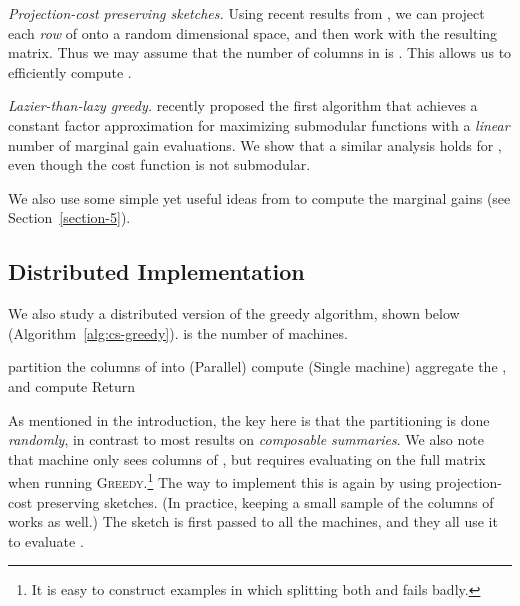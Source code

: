 \documentclass{article}
\newcommand{\greedy}{\textsc{Greedy}}
\begin{document}
{\em Projection-cost preserving sketches.}
Using recent results from \cite{Cohen}, we can project each {\em row} of  onto a random  dimensional space, and then work with the resulting matrix. Thus we may assume that the number of columns in  is . This allows us to efficiently compute .

\iffalse
\textbf{Random projections to reduce the number of rows.} We can project each column of  and  onto a random  dimensional space, and then work with the resulting matrices. Thus we may assume that the number of rows in both  and  is , which can be a big improvement. This can be obtained by a union bound on Lemma 10 from \cite{Sarlos}. (Full details in appendix.)
\fi

{\em Lazier-than-lazy greedy.}
\cite{Mirzasoleiman} recently proposed the first algorithm that achieves a constant factor approximation for maximizing submodular functions with a {\em linear} number of marginal gain evaluations. We show that a similar analysis holds for , even though the cost function is not submodular.

We also use some simple yet useful ideas from \cite{Farahat2} to compute the marginal gains (see Section~\ref{section-5}).

\subsection{Distributed Implementation}
We also study a distributed version of the greedy algorithm, shown below (Algorithm~\ref{alg:cs-greedy}).  is the number of machines.

\begin{algorithm} \label{alg:cs-greedy}
\caption{(, , , )}
\begin{algorithmic}[1]
 partition the columns of  into 
\STATE (Parallel) compute 
\STATE (Single machine) aggregate the , and compute 
\STATE Return 
\end{algorithmic}
\end{algorithm}

As mentioned in the introduction, the key here is that the partitioning is done {\em randomly}, in contrast to most results on {\em composable summaries}. We also note that machine  only sees columns  of , but requires evaluating  on the full matrix  when running \greedy.\footnote{It is easy to construct examples in which splitting both  and  fails badly.} The way to implement this is again by using projection-cost preserving sketches. (In practice, keeping a small sample of the columns of  works as well.) The sketch is first passed to all the machines, and they all use it to evaluate .
\end{document}
